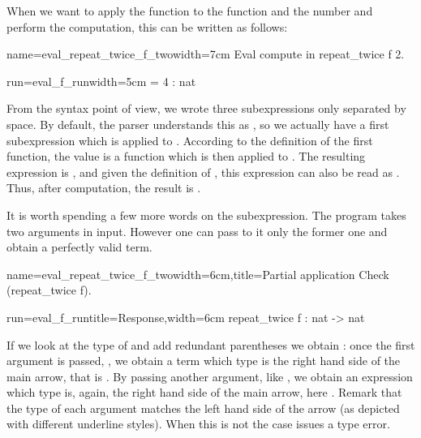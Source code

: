 When we want to apply the function  to the function
 and the number  and perform the computation, this can be
written as follows:

\begin{coq}{name=eval_repeat_twice_f_two}{width=7cm}
Eval compute in repeat_twice f 2.
\end{coq}
\begin{coqout}{run=eval_f_run}{width=5cm}
= 4 : nat
\end{coqout}
From the syntax point of view, we wrote three subexpressions only
separated by space.  By default, the parser understands this as
, so we actually have a first subexpression
which is  applied to .  According to the
definition of the first function, the value is 
a function 
which is then applied to . 
The resulting expression is , and given the
definition of , this expression can also
be read as .  Thus, after computation, the result is .

It is worth spending a few more words on the  subexpression.
The  program takes two arguments in input. However one
can pass to it only the former one and obtain a perfectly valid term.

\begin{coq}{name=eval_repeat_twice_f_two}{width=6cm,title=Partial application}
Check (repeat_twice f).
\end{coq}
\begin{coqout}{run=eval_f_run}{title=Response,width=6cm}
repeat_twice f : nat -> nat
\end{coqout}
If we look at the type of  and add redundant parentheses
we obtain :
once the first argument
is passed, , we obtain a term which type is
the right hand side of the main arrow, that is .
By passing another argument, like , we obtain an expression
which type is, again, the right hand side of the main arrow, here .
Remark that the type of each argument matches the left hand side of
the arrow (as depicted with different underline styles).
When this is not the case \Coq{} issues a type error.

